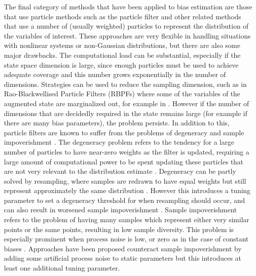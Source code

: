 \documentclass[journal]{IEEEtran}
\begin{document}
The final category of methods that have been applied to bias estimation are those that use particle methods such as the particle filter and other related methods that use a number of (usually weighted) particles to represent the distribution of the variables of interest. These approaches are very flexible in handling situations with nonlinear systems or non-Gaussian distributions, but there are also some major drawbacks. The computational load can be substantial, especially if the state space dimension is large, since enough particles must be used to achieve adequate coverage and this number grows exponentially in the number of dimensions. Strategies can be used to reduce the sampling dimension, such as in Rao-Blackwellised Particle Filters (RBPFs) where some of the variables of the augmented state are marginalized out, for example in \cite{li2003parameter}. However if the number of dimensions that are decidedly required in the state remains large (for example if there are many bias parameters), the problem persists. In addition to this, particle filters are known to suffer from the problems of degeneracy and sample impoverishment \cite{gordon2004beyond}. The degeneracy problem refers to the tendency for a large number of particles to have near-zero weights as the filter is updated, requiring a large amount of computational power to be spent updating these particles that are not very relevant to the distribution estimate \cite{gordon2004beyond}. Degeneracy can be partly solved by resampling, where samples are redrawn to have equal weights but still represent approximately the same distribution \cite{gordon2004beyond}. However this introduces a tuning parameter to set a degeneracy threshold for when resampling should occur, and can also result in worsened sample impoverishment \cite{gordon2004beyond}. Sample impoverishment refers to the problem of having many samples which represent either very similar points or the same points, resulting in low sample diversity. This problem is especially prominent when process noise is low, or zero as in the case of constant biases \cite{gordon2004beyond}. Approaches have been proposed counteract sample impoverishment by adding some artificial process noise to static parameters \cite{liu2001combined, gellert2018parameter} but this introduces at least one additional tuning parameter.
\end{document}
